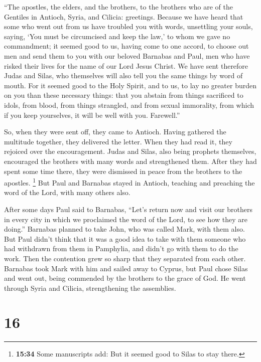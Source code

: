 ``The apostles, the elders, and the brothers, to the brothers who are of
the Gentiles in Antioch, Syria, and Cilicia: greetings. 
Because we have heard that some who went out from us have troubled you
with words, unsettling your souls, saying, `You must be circumcised and
keep the law,' to whom we gave no commandment;  it seemed
good to us, having come to one accord, to choose out men and send them
to you with our beloved Barnabas and Paul,  men who have
risked their lives for the name of our Lord Jesus Christ.
 We have sent therefore Judas and Silas, who themselves
will also tell you the same things by word of mouth.  For
it seemed good to the Holy Spirit, and to us, to lay no greater burden
on you than these necessary things:  that you abstain
from things sacrificed to idols, from blood, from things strangled, and
from sexual immorality, from which if you keep yourselves, it will be
well with you. Farewell.''

 So, when they were sent off, they came to Antioch.
Having gathered the multitude together, they delivered the letter.
 When they had read it, they rejoiced over the
encouragement.  Judas and Silas, also being prophets
themselves, encouraged the brothers with many words and strengthened
them.  After they had spent some time there, they were
dismissed in peace from the brothers to the apostles. 
\footnote{\textbf{15:34} Some manuscripts add: But it seemed good to
  Silas to stay there.}  But Paul and Barnabas stayed in
Antioch, teaching and preaching the word of the Lord, with many others
also.

 After some days Paul said to Barnabas, ``Let's return
now and visit our brothers in every city in which we proclaimed the word
of the Lord, to see how they are doing.''  Barnabas
planned to take John, who was called Mark, with them also.
 But Paul didn't think that it was a good idea to take
with them someone who had withdrawn from them in Pamphylia, and didn't
go with them to do the work.  Then the contention grew so
sharp that they separated from each other. Barnabas took Mark with him
and sailed away to Cyprus,  but Paul chose Silas and went
out, being commended by the brothers to the grace of God.
 He went through Syria and Cilicia, strengthening the
assemblies.

\hypertarget{section-15}{%
\section{16}\label{section-15}}

